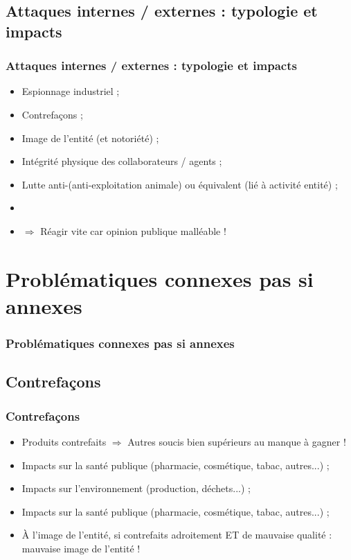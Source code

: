 \documentclass[slidetop,11pt]{beamer}
\begin{document}
\subsection{Attaques internes / externes : typologie et impacts}
\begin{frame}
	\frametitle{Attaques internes / externes : typologie et impacts}
	\begin{itemize}
		\item Espionnage industriel ; 
		\item Contrefa\c{c}ons ; 
		\item Image de l'entit{\'e} (et notori{\'e}t{\'e}) ;
		\item Int{\'e}grit{\'e} physique des collaborateurs / agents ; 
		\item Lutte anti-(anti-exploitation animale) ou {\'e}quivalent (li{\'e} {\`a} activit{\'e} entit{\'e}) ; 
		\item[] 
		\item $\Rightarrow$ R{\'e}agir vite car opinion publique mall{\'e}able !
	\end{itemize}
\end{frame}

\section{Probl{\'e}matiques connexes pas si annexes }
\begin{frame}
	\frametitle{Probl{\'e}matiques connexes pas si annexes }
	\tableofcontents[sections=2,currentsection,subsectionstyle=show/shaded/hide] %
\end{frame}

\subsection{Contrefa\c{c}ons}
\begin{frame}
	\frametitle{Contrefa\c{c}ons}
	\begin{itemize}
		\item Produits contrefaits $\Rightarrow$ Autres soucis bien sup{\'e}rieurs au manque {\`a} gagner !
		\item Impacts sur la sant{\'e} publique (pharmacie, cosm{\'e}tique, tabac, autres...) ; 
		\item Impacts sur l'environnement (production, d{\'e}chets...) ; 
		\item Impacts sur la sant{\'e} publique (pharmacie, cosm{\'e}tique, tabac, autres...) ; 
		\item {\`A} l'image de l'entit{\'e}, si contrefaits adroitement ET de mauvaise qualit{\'e} : mauvaise image de l'entit{\'e} !
	\end{itemize}
\end{frame}
\end{document}
